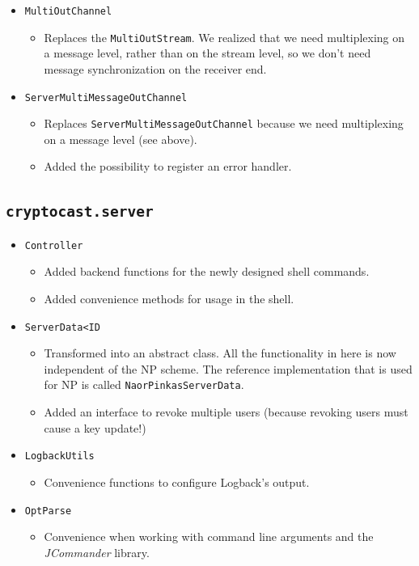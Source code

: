 \documentclass[a4paper,10pt]{scrartcl}
\begin{document}
\begin{itemize}
  \item \lstinline|MultiOutChannel|
  \begin{itemize}
   \item Replaces the \lstinline|MultiOutStream|. We realized that we need multiplexing on a
         message level, rather than on the stream level, so we don't need message synchronization
         on the receiver end.
  \end{itemize}

  \item \lstinline|ServerMultiMessageOutChannel|
  \begin{itemize}
   \item Replaces \lstinline|ServerMultiMessageOutChannel| because we need multiplexing
   on a message level (see above).
   \item Added the possibility to register an error handler.
  \end{itemize}
\end{itemize}

\subsection{\lstinline|cryptocast.server|}

\begin{itemize}

\item \lstinline|Controller|
\begin{itemize}
 \item Added backend functions for the newly designed shell commands.
 \item Added convenience methods for usage in the shell.
\end{itemize}

\item \lstinline|ServerData<ID|
\begin{itemize}
  \item Transformed into an abstract class. All the functionality in here is now
        independent of the NP scheme. The reference implementation that is used for
        NP is called \lstinline|NaorPinkasServerData|.
  \item Added an interface to revoke multiple users (because revoking users must cause a
        key update!)
\end{itemize}

\item \lstinline|LogbackUtils|
  \begin{itemize}
   \item Convenience functions to configure Logback's output.
  \end{itemize}

\item \lstinline|OptParse|
\begin{itemize}
  \item Convenience when working with command line arguments and the \emph{JCommander} library.
\end{itemize}

\end{itemize}
\end{document}

